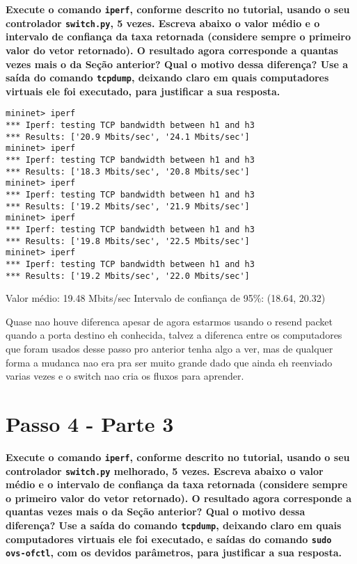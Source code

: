 \documentclass[12pt,letterpaper]{article}
\begin{document}
\textbf{Execute o comando \texttt{iperf}, conforme descrito no
tutorial, usando o seu controlador \texttt{switch.py}, 5 vezes.
Escreva abaixo o valor médio e o intervalo de confiança da taxa
retornada (considere sempre o primeiro valor do vetor retornado). O
resultado agora corresponde a quantas vezes mais o da Seção anterior?
Qual o motivo dessa diferença? Use a saída do comando
\texttt{tcpdump}, deixando claro em quais computadores virtuais ele
foi executado, para justificar a sua resposta.}

\begin{verbatim}
mininet> iperf
*** Iperf: testing TCP bandwidth between h1 and h3
*** Results: ['20.9 Mbits/sec', '24.1 Mbits/sec']
mininet> iperf
*** Iperf: testing TCP bandwidth between h1 and h3
*** Results: ['18.3 Mbits/sec', '20.8 Mbits/sec']
mininet> iperf
*** Iperf: testing TCP bandwidth between h1 and h3
*** Results: ['19.2 Mbits/sec', '21.9 Mbits/sec']
mininet> iperf
*** Iperf: testing TCP bandwidth between h1 and h3
*** Results: ['19.8 Mbits/sec', '22.5 Mbits/sec']
mininet> iperf
*** Iperf: testing TCP bandwidth between h1 and h3
*** Results: ['19.2 Mbits/sec', '22.0 Mbits/sec']
\end{verbatim}

Valor médio: 19.48 Mbits/sec
Intervalo de confiança de 95\%: (18.64, 20.32)

Quase nao houve diferenca apesar de agora estarmos usando o resend packet quando a porta destino eh conhecida,
talvez a diferenca entre os computadores que foram usados desse passo pro anterior tenha algo a ver, mas de qualquer forma a mudanca nao era pra ser muito grande dado que ainda eh reenviado varias vezes e o switch nao cria os fluxos para aprender.

\section{Passo 4 - Parte 3}

\textbf{Execute o comando \texttt{iperf}, conforme descrito no
tutorial, usando o seu controlador \texttt{switch.py} melhorado, 5
vezes. Escreva abaixo o valor médio e o intervalo de confiança da taxa
retornada (considere sempre o primeiro valor do vetor retornado). O
resultado agora corresponde a quantas vezes mais o da Seção anterior?
Qual o motivo dessa diferença? Use a saída do comando
\texttt{tcpdump}, deixando claro em quais computadores virtuais ele
foi executado, e saídas do comando \texttt{sudo ovs-ofctl}, com os
devidos parâmetros, para justificar a sua resposta.}
\end{document}
